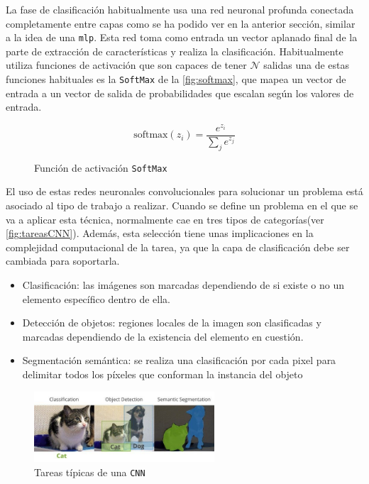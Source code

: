 La fase de clasificación habitualmente usa una red neuronal profunda conectada completamente entre capas como se ha podido ver en la anterior sección, similar a la idea de una \texttt{\acrshort{mlp}}. Esta 
red toma como entrada un vector aplanado final de la parte de extracción de características y realiza la clasificación. Habitualmente utiliza funciones de activación que son capaces de tener \(\mathcal{N}\) salidas 
una de estas funciones habituales es la \texttt{SoftMax} de la \autoref{fig:softmax}, que mapea un vector de entrada a un vector de salida de probabilidades que escalan según los valores de entrada.

\begin{figure}[H]
    \centering
    \begin{equation*}
        \text{softmax}(z_i) = \frac{e^{z_i}}{\sum_j e^{z_j}}
    \end{equation*}
    \caption{Función de activación \texttt{SoftMax}}
    \label{fig:softmax}
\end{figure}

\vspace{3\baselineskip}

El uso de estas redes neuronales convolucionales para solucionar un problema está asociado al tipo de trabajo a realizar. Cuando se define un problema en el que se va a aplicar esta técnica, normalmente 
cae en tres tipos de categorías(ver \autoref{fig:tareasCNN}). Además, esta selección tiene unas implicaciones en la complejidad computacional de la tarea, ya que la capa de clasificación debe ser cambiada para soportarla.

\begin{itemize}
    \item Clasificación: las imágenes son marcadas dependiendo de si existe o no un elemento específico dentro de ella.
    \item Detección de objetos: regiones locales de la imagen son clasificadas y marcadas dependiendo de la existencia del elemento en cuestión.
    \item Segmentación semántica: se realiza una clasificación por cada pixel para delimitar todos los píxeles que conforman la instancia del objeto
\end{itemize}

\begin{figure}[H]
    \centering
    \includegraphics[width=0.6\textwidth]{images/4/TiposTareas.png}
    \caption{Tareas típicas de una \texttt{CNN}\cite{kallfelzsirmacekSEQUENTIALIMAGEPROCESSING2019}}
    \label{fig:tareasCNN}
\end{figure}

